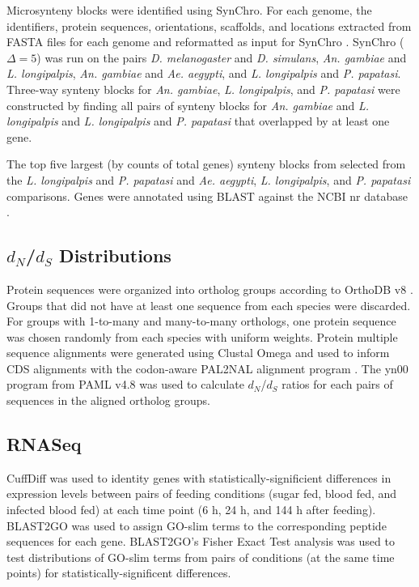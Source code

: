 Microsynteny blocks were identified using SynChro. For each genome, the identifiers, protein sequences, orientations, scaffolds, and locations extracted from FASTA files for each genome and reformatted as input for SynChro \cite{Drillon2014}.  SynChro ($\Delta=5$) was run on the pairs \emph{D. melanogaster} and \emph{D. simulans}, \emph{An. gambiae} and \emph{L. longipalpis}, \emph{An. gambiae} and \emph{Ae. aegypti}, and \emph{L. longipalpis} and \emph{P. papatasi}.  Three-way synteny blocks for \emph{An. gambiae}, \emph{L. longipalpis}, and \emph{P. papatasi} were constructed by finding all pairs of synteny blocks for \emph{An. gambiae} and \emph{L. longipalpis} and \emph{L. longipalpis} and \emph{P. papatasi} that overlapped by at least one gene.  

The top five largest (by counts of total genes) synteny blocks from selected from the \emph{L. longipalpis} and \emph{P. papatasi} and \emph{Ae. aegypti}, \emph{L. longipalpis}, and \emph{P. papatasi} comparisons.  Genes were annotated using BLAST against the NCBI nr database \cite{Pruitt2007}.

\subsection{$d_N$/$d_S$ Distributions}
Protein sequences were organized into ortholog groups according to OrthoDB v8 \cite{Kriventseva2015}. Groups that did not have at least one sequence from each species were discarded.  For groups with 1-to-many and many-to-many orthologs, one protein sequence was chosen randomly from each species with uniform weights. Protein multiple sequence alignments were generated using Clustal Omega \cite{Sievers2011} and used to inform CDS alignments with the codon-aware PAL2NAL alignment program \cite{Suyama2006}.  The yn00 program from PAML v4.8 \cite{Yang2007} was used to calculate $d_N$/$d_S$ ratios for each pairs of sequences in the aligned ortholog groups.

\subsection{RNASeq}
CuffDiff \cite{Trapnell2010} was used to identity genes with statistically-significient differences in expression levels between pairs of feeding conditions (sugar fed, blood fed, and infected blood fed) at each time point (6 h, 24 h, and 144 h after feeding).  BLAST2GO \cite{Conesa2005,Gotz2008} was used to assign GO-slim terms \cite{Consortium2004} to the corresponding peptide sequences for each gene. BLAST2GO's Fisher Exact Test analysis was used to test distributions of GO-slim terms from pairs of conditions (at the same time points) for statistically-significent differences.

